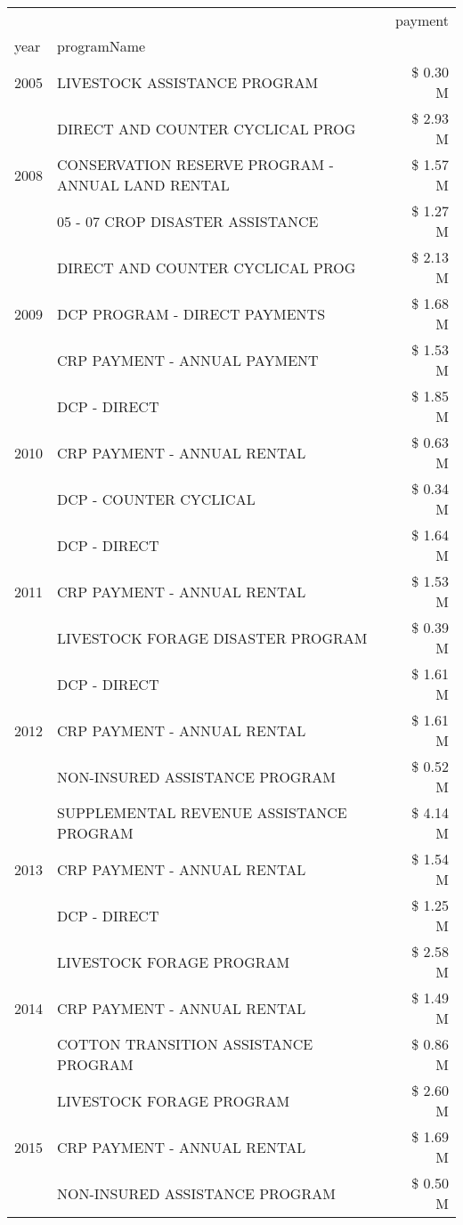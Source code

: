\begin{tabular}{llr}
\toprule
 &  & payment \\
year & programName &  \\
\midrule
2005 & LIVESTOCK ASSISTANCE PROGRAM & \$ 0.30 M \\
\cline{1-3}
\multirow[t]{3}{*}{2008} & DIRECT AND COUNTER CYCLICAL PROG & \$ 2.93 M \\
 & CONSERVATION RESERVE PROGRAM - ANNUAL LAND RENTAL & \$ 1.57 M \\
 & 05 - 07 CROP DISASTER ASSISTANCE & \$ 1.27 M \\
\cline{1-3}
\multirow[t]{3}{*}{2009} & DIRECT AND COUNTER CYCLICAL PROG & \$ 2.13 M \\
 & DCP PROGRAM - DIRECT PAYMENTS & \$ 1.68 M \\
 & CRP PAYMENT - ANNUAL PAYMENT & \$ 1.53 M \\
\cline{1-3}
\multirow[t]{3}{*}{2010} & DCP - DIRECT & \$ 1.85 M \\
 & CRP PAYMENT - ANNUAL RENTAL & \$ 0.63 M \\
 & DCP - COUNTER CYCLICAL & \$ 0.34 M \\
\cline{1-3}
\multirow[t]{3}{*}{2011} & DCP - DIRECT & \$ 1.64 M \\
 & CRP PAYMENT - ANNUAL RENTAL & \$ 1.53 M \\
 & LIVESTOCK FORAGE DISASTER PROGRAM & \$ 0.39 M \\
\cline{1-3}
\multirow[t]{3}{*}{2012} & DCP - DIRECT & \$ 1.61 M \\
 & CRP PAYMENT - ANNUAL RENTAL & \$ 1.61 M \\
 & NON-INSURED ASSISTANCE PROGRAM & \$ 0.52 M \\
\cline{1-3}
\multirow[t]{3}{*}{2013} & SUPPLEMENTAL REVENUE ASSISTANCE PROGRAM & \$ 4.14 M \\
 & CRP PAYMENT - ANNUAL RENTAL & \$ 1.54 M \\
 & DCP - DIRECT & \$ 1.25 M \\
\cline{1-3}
\multirow[t]{3}{*}{2014} & LIVESTOCK FORAGE PROGRAM & \$ 2.58 M \\
 & CRP PAYMENT - ANNUAL RENTAL & \$ 1.49 M \\
 & COTTON TRANSITION ASSISTANCE PROGRAM & \$ 0.86 M \\
\cline{1-3}
\multirow[t]{3}{*}{2015} & LIVESTOCK FORAGE PROGRAM & \$ 2.60 M \\
 & CRP PAYMENT - ANNUAL RENTAL & \$ 1.69 M \\
 & NON-INSURED ASSISTANCE PROGRAM & \$ 0.50 M \\

\end{tabular}
